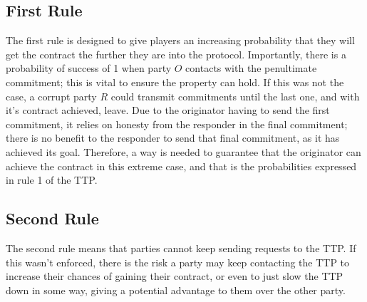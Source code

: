 \documentclass{l4proj}
\begin{document}
\subsection{First Rule}
The first rule is designed to give players an increasing probability that they will get the contract the further they are into the protocol. Importantly, there is a probability of success of 1 when party $O$ contacts with the penultimate commitment; this is vital to ensure the property can hold. If this was not the case, a corrupt party $R$ could transmit commitments until the last one, and with it's contract achieved, leave. Due to the originator having to send the first commitment, it relies on honesty from the responder in the final commitment; there is no benefit to the responder to send that final commitment, as it has achieved its goal. Therefore, a way is needed to guarantee that the originator can achieve the contract in this extreme case, and that is the probabilities expressed in rule 1 of the TTP.

\subsection{Second Rule}
The second rule means that parties cannot keep sending requests to the TTP. If this wasn't enforced, there is the risk a party may keep contacting the TTP  to increase their chances of gaining their contract, or even to just slow the TTP down in some way, giving a potential advantage to them over the other party.
\end{document}

